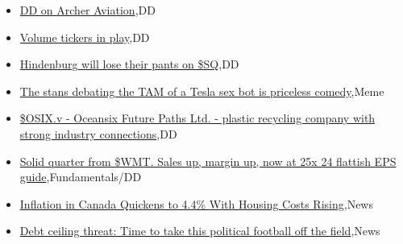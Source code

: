 \documentclass{article}%
\begin{document}
%
\begin{itemize}%
\item%
\href{https://reddit.com/r/wallstreetbets/comments/13kxi6u/dd\_on\_archer\_aviation/}{DD on Archer Aviation},DD%
\item%
\href{https://reddit.com/r/wallstreetbets/comments/13kx4kd/volume\_tickers\_in\_play/}{Volume tickers in play},DD%
\item%
\href{https://reddit.com/r/wallstreetbets/comments/13kx18m/hindenburg\_will\_lose\_their\_pants\_on\_sq/}{Hindenburg will lose their pants on \$SQ},DD%
\item%
\href{https://reddit.com/r/wallstreetbets/comments/13kwo52/the\_stans\_debating\_the\_tam\_of\_a\_tesla\_sex\_bot\_is/}{The stans debating the TAM of a Tesla sex bot is priceless comedy},Meme%
\item%
\href{https://reddit.com/r/Baystreetbets/comments/13k9lqh/osixv\_oceansix\_future\_paths\_ltd\_plastic\_recycling/}{\$OSIX.v - Oceansix Future Paths Ltd. - plastic recycling company with strong industry connections},DD%
\item%
\href{https://reddit.com/r/StockMarket/comments/13ky1kx/solid\_quarter\_from\_wmt\_sales\_up\_margin\_up\_now\_at/}{Solid quarter from \$WMT. Sales up, margin up, now at 25x 24 flattish EPS guide},Fundamentals/DD%
\item%
\href{https://reddit.com/r/Economics/comments/13kv8lv/inflation\_in\_canada\_quickens\_to\_44\_with\_housing/}{Inflation in Canada Quickens to 4.4\% With Housing Costs Rising},News%
\item%
\href{https://reddit.com/r/Economics/comments/13k8phw/debt\_ceiling\_threat\_time\_to\_take\_this\_political/}{Debt ceiling threat: Time to take this political football off the field},News%
\end{itemize}%
\end{document}

